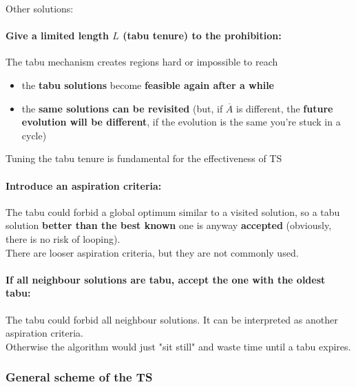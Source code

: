 \newpage

Other solutions:

\paragraph{Give a limited length $L$ (tabu tenure) to the prohibition:} The tabu mechanism creates regions hard or impossible to reach
\begin{itemize}
	\item the \textbf{tabu solutions} become \textbf{feasible again after a while}
	
	\item the \textbf{same solutions can be revisited} (but, if $\overline{A}$ is different, the \textbf{future evolution will be different}, if the evolution is the same you're stuck in a cycle)
\end{itemize}

Tuning the tabu tenure is fundamental for the effectiveness of TS\\

\paragraph{Introduce an aspiration criteria:} The tabu could forbid a global optimum similar to a visited solution, so a tabu solution \textbf{better than the best known} one is anyway \textbf{accepted} (obviously, there is no risk of looping).\\

There are looser aspiration criteria, but they are not commonly used.\\

\paragraph{If all neighbour solutions are tabu, accept the one with the oldest tabu:} The tabu could forbid all neighbour solutions. It can be interpreted as another aspiration criteria.\\
Otherwise the algorithm would just "sit still" and waste time until a tabu expires.\\

\newpage

\subsubsection{General scheme of the TS}

